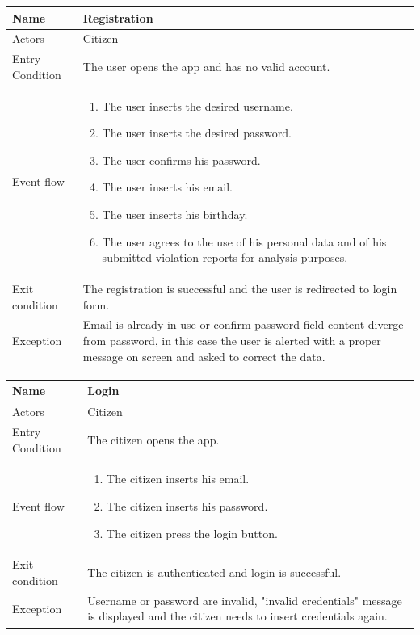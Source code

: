 \begin{tabular}{|p{3.1cm}|p{11.6cm}|}
\hline
Name & Registration\\
\hline
Actors & Citizen\\
\hline
Entry Condition & The user opens the app and has no valid account.\\
\hline
Event flow & \begin{enumerate}
                \item The user inserts the desired username.
                \item The user inserts the desired password.
                \item The user confirms his password.
                \item The user inserts his email.
                \item The user inserts his birthday.
                \item The user agrees to the use of his personal data and of his submitted violation reports for analysis purposes.
            \end{enumerate}\\
\hline
Exit condition & The registration is successful and the user is redirected to login form.\\
\hline
Exception & Email is already in use or confirm password field content diverge from password, in this case the user is alerted with a proper message on screen and asked to correct the data.\\
\hline
\end{tabular}

\vskip 0.2in
\begin{tabular}{|p{3.1cm}|p{11.6cm}|}
\hline
Name & Login\\
\hline
Actors & Citizen\\
\hline
Entry Condition & The citizen opens the app.\\
\hline
Event flow & \begin{enumerate}
                \item The citizen inserts his email.
                \item The citizen inserts his password.
                \item The citizen press the login button.
            \end{enumerate}\\
\hline
Exit condition & The citizen is authenticated and login is successful.\\
\hline
Exception & Username or password are invalid, "invalid credentials" message is displayed and the citizen needs to insert credentials again.\\
\hline
\end{tabular}

